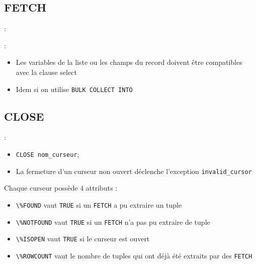 \documentclass[10pt]{beamer}
\begin{document}
\subsection{FETCH}
\begin{frame}{\secname : \subsecname}
    
\end{frame}


\begin{frame}{\secname : \subsecname}
    \begin{itemize}
        \item Les variables de la liste ou les champs du record doivent être compatibles avec la clause select
        \item Idem si on utilise \lstinline[language=plsql]!BULK COLLECT INTO!
    \end{itemize}
\end{frame}

\subsection{CLOSE}
\begin{frame}{\secname : \subsecname}
    \begin{itemize}
        \item \lstinline[language=plsql]!CLOSE nom_curseur!;
        \item La fermeture d'un curseur non ouvert déclenche l'exception \lstinline[language=plsql]!invalid_cursor!
    \end{itemize}
\end{frame}


\begin{frame}[allowframebreaks]{\secname}
    
\end{frame}


\begin{frame}[allowframebreaks]{\secname}
    
\end{frame}

\begin{frame}{\secname}
    Chaque curseur possède 4 attributs :
    \begin{itemize}
        \item \lstinline[language=plsql]!\%FOUND! vaut \lstinline[language=plsql]!TRUE! si un \lstinline[language=plsql]!FETCH! a pu extraire un tuple
        \item \lstinline[language=plsql]!\%NOTFOUND! vaut \lstinline[language=plsql]!TRUE! si un \lstinline[language=plsql]!FETCH! n'a pas pu extraire de tuple
        \item \lstinline[language=plsql]!\%ISOPEN! vaut \lstinline[language=plsql]!TRUE! si le curseur est ouvert
        \item \lstinline[language=plsql]!\%ROWCOUNT! vaut le nombre de tuples qui ont déjà été extraits par des \lstinline[language=plsql]!FETCH!
    \end{itemize}
\end{frame}
\end{document}
